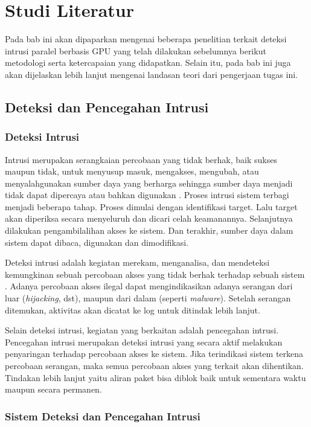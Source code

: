 \chapter{Studi Literatur}

  Pada bab ini akan dipaparkan mengenai beberapa penelitian terkait deteksi intrusi paralel berbasis GPU yang telah dilakukan sebelumnya berikut metodologi serta ketercapaian yang didapatkan. Selain itu, pada bab ini juga akan dijelaskan lebih lanjut mengenai landasan teori dari pengerjaan tugas ini.


\section{Deteksi dan Pencegahan Intrusi}

  \subsection{Deteksi Intrusi}

    Intrusi merupakan serangkaian percobaan yang tidak berhak, baik sukses maupun tidak, untuk menyusup masuk, mengakses, mengubah, atau menyalahgunakan sumber daya yang berharga sehingga sumber daya menjadi tidak dapat dipercaya atau bahkan digunakan \parencite{kizza2015}. Proses intrusi sistem terbagi menjadi beberapa tahap. Proses dimulai dengan identifikasi target. Lalu target akan diperiksa secara menyeluruh dan dicari celah keamanannya. Selanjutnya dilakukan pengambilalihan akses ke sistem. Dan terakhir, sumber daya dalam sistem dapat dibaca, digunakan dan dimodifikasi. 

    Deteksi intrusi adalah kegiatan merekam, menganalisa, dan mendeteksi kemungkinan sebuah percobaan akses yang tidak berhak terhadap sebuah sistem \parencite{kizza2015}. Adanya percobaan akses ilegal dapat mengindikasikan adanya serangan dari luar (\emph{hijacking}, dst), maupun dari dalam (seperti \emph{malware}). Setelah serangan ditemukan, aktivitas akan dicatat ke log untuk ditindak lebih lanjut.

    Selain deteksi intrusi, kegiatan yang berkaitan adalah pencegahan intrusi. Pencegahan intrusi merupakan deteksi intrusi yang secara aktif melakukan penyaringan terhadap percobaan akses ke sistem. Jika terindikasi sistem terkena percobaan serangan, maka semua percobaan akses yang terkait akan dihentikan. Tindakan lebih lanjut yaitu aliran paket bisa diblok baik untuk sementara waktu maupun secara permanen.

  \subsection{Sistem Deteksi dan Pencegahan Intrusi}

